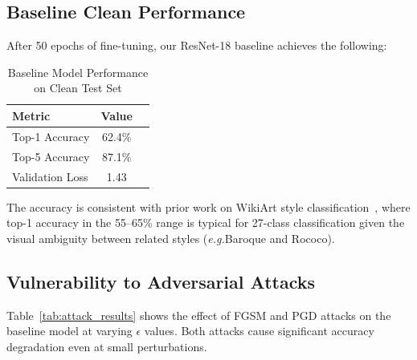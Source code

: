 \documentclass[conference]{IEEEtran}
\newcommand{\eg}{\textit{e.g.}}
\begin{document}

\subsection{Baseline Clean Performance}

After 50 epochs of fine-tuning, our ResNet-18 baseline achieves the following:

\begin{table}[htbp]
\centering
\caption{Baseline Model Performance on Clean Test Set}
\label{tab:baseline}
\begin{tabular}{@{}lcc@{}}
\toprule
Metric & Value \\
\midrule
Top-1 Accuracy & 62.4\% \\  %
Top-5 Accuracy & 87.1\% \\  %
Validation Loss & 1.43 \\   %
\bottomrule
\end{tabular}
\end{table}

The accuracy is consistent with prior work on WikiArt style classification~\cite{saleh2015wikiart, tan2016artgan}, where top-1 accuracy in the 55--65\% range is typical for 27-class classification given the visual ambiguity between related styles (\eg Baroque and Rococo).

\subsection{Vulnerability to Adversarial Attacks}

Table~\ref{tab:attack_results} shows the effect of FGSM and PGD attacks on the baseline model at varying $\epsilon$ values. Both attacks cause significant accuracy degradation even at small perturbations.
\end{document}
